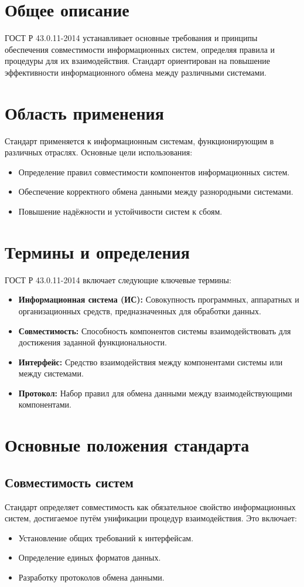 \section*{Общее описание}
ГОСТ Р 43.0.11-2014 устанавливает основные требования и принципы обеспечения совместимости информационных систем, определяя правила и процедуры для их взаимодействия. Стандарт ориентирован на повышение эффективности информационного обмена между различными системами.

\section*{Область применения}
Стандарт применяется к информационным системам, функционирующим в различных отраслях. Основные цели использования:
\begin{itemize}
    \item Определение правил совместимости компонентов информационных систем.
    \item Обеспечение корректного обмена данными между разнородными системами.
    \item Повышение надёжности и устойчивости систем к сбоям.
\end{itemize}

\section*{Термины и определения}
ГОСТ Р 43.0.11-2014 включает следующие ключевые термины:
\begin{itemize}
    \item \textbf{Информационная система (ИС):} Совокупность программных, аппаратных и организационных средств, предназначенных для обработки данных.
    \item \textbf{Совместимость:} Способность компонентов системы взаимодействовать для достижения заданной функциональности.
    \item \textbf{Интерфейс:} Средство взаимодействия между компонентами системы или между системами.
    \item \textbf{Протокол:} Набор правил для обмена данными между взаимодействующими компонентами.
\end{itemize}

\section*{Основные положения стандарта}

\subsection*{Совместимость систем}
Стандарт определяет совместимость как обязательное свойство информационных систем, достигаемое путём унификации процедур взаимодействия. Это включает:
\begin{itemize}
    \item Установление общих требований к интерфейсам.
    \item Определение единых форматов данных.
    \item Разработку протоколов обмена данными.
\end{itemize}

